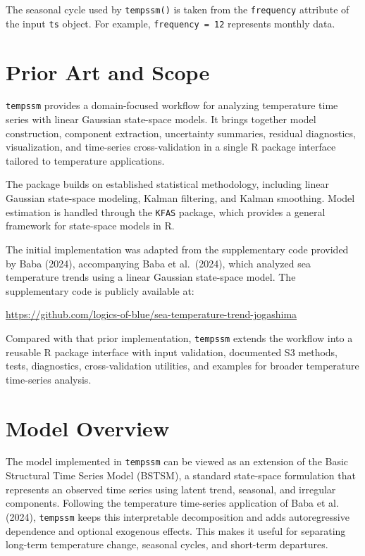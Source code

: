 \documentclass[
]{article}
\begin{document}
The seasonal cycle used by \texttt{tempssm()} is taken from the
\texttt{frequency} attribute of the input \texttt{ts} object. For
example, \texttt{frequency\ =\ 12} represents monthly data.

\section{Prior Art and Scope}\label{prior-art-and-scope}

\texttt{tempssm} provides a domain-focused workflow for analyzing
temperature time series with linear Gaussian state-space models. It
brings together model construction, component extraction, uncertainty
summaries, residual diagnostics, visualization, and time-series
cross-validation in a single R package interface tailored to temperature
applications.

The package builds on established statistical methodology, including
linear Gaussian state-space modeling, Kalman filtering, and Kalman
smoothing. Model estimation is handled through the \texttt{KFAS}
package, which provides a general framework for state-space models in R.

The initial implementation was adapted from the supplementary code
provided by Baba (2024), accompanying Baba et al.~(2024), which analyzed
sea temperature trends using a linear Gaussian state-space model. The
supplementary code is publicly available at:

\url{https://github.com/logics-of-blue/sea-temperature-trend-jogashima}

Compared with that prior implementation, \texttt{tempssm} extends the
workflow into a reusable R package interface with input validation,
documented S3 methods, tests, diagnostics, cross-validation utilities,
and examples for broader temperature time-series analysis.

\section{Model Overview}\label{model-overview}

The model implemented in \texttt{tempssm} can be viewed as an extension
of the Basic Structural Time Series Model (BSTSM), a standard
state-space formulation that represents an observed time series using
latent trend, seasonal, and irregular components. Following the
temperature time-series application of Baba et al. (2024),
\texttt{tempssm} keeps this interpretable decomposition and adds
autoregressive dependence and optional exogenous effects. This makes it
useful for separating long-term temperature change, seasonal cycles, and
short-term departures.
\end{document}
